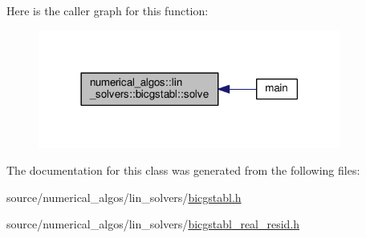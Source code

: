 Here is the caller graph for this function\-:
\nopagebreak
\begin{figure}[H]
\begin{center}
\leavevmode
\includegraphics[width=282pt]{classnumerical__algos_1_1lin__solvers_1_1bicgstabl_a2dd4f6cdd207b1a77aa94831fbdf9839_icgraph}
\end{center}
\end{figure}




The documentation for this class was generated from the following files\-:\begin{DoxyCompactItemize}
\item 
source/numerical\-\_\-algos/lin\-\_\-solvers/\hyperlink{bicgstabl_8h}{bicgstabl.\-h}\item 
source/numerical\-\_\-algos/lin\-\_\-solvers/\hyperlink{bicgstabl__real__resid_8h}{bicgstabl\-\_\-real\-\_\-resid.\-h}\end{DoxyCompactItemize}
